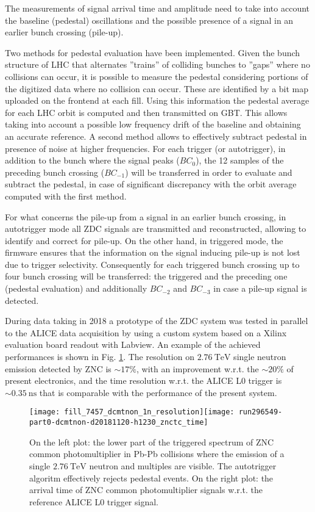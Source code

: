 The measurements of signal arrival time and amplitude need to take into account the baseline (pedestal) oscillations and the possible presence of a signal in an earlier bunch crossing (pile-up).

Two methods for pedestal evaluation have been implemented. Given the bunch structure of LHC that alternates ''trains'' of colliding bunches to ''gaps'' where no collisions can occur, it is possible to measure the pedestal considering portions of the digitized data where no collision can occur. These are identified by a bit map uploaded on the frontend at each fill. Using this information the pedestal average for each LHC orbit is computed and then transmitted on GBT. This allows taking into account a possible low frequency drift of the baseline and obtaining an accurate reference. A second method allows to effectively subtract pedestal in presence of noise at higher frequencies. For each trigger (or autotrigger), in addition to the bunch where the signal peaks ($BC_0$), the 12 samples of the preceding bunch crossing ($BC_{-1}$) will be transferred in order to evaluate and subtract the pedestal, in case of significant discrepancy with the orbit average computed with the first method.

For what concerns the pile-up from a signal in an earlier bunch crossing, in autotrigger mode all ZDC signals are transmitted and reconstructed, allowing to identify and correct for pile-up. On the other hand, in triggered mode, the firmware ensures that the information on the signal inducing pile-up is not lost due to trigger selectivity. Consequently for each triggered bunch crossing up to four bunch crossing will be transferred: the triggered and the preceding one (pedestal evaluation) and additionally $BC_{-2}$ and $BC_{-3}$ in case a pile-up signal is detected.

During \PbPb data taking in 2018 a prototype of the ZDC system was tested in parallel to the ALICE data acquisition by using a custom system based on a Xilinx evaluation board readout with Labview. An example of the achieved performances is shown in Fig. \ref{fig:zdc-signals}. The resolution on $\SI{2.76}{\tera\electronvolt}$ single neutron emission detected by ZNC is $\sim17\%$, with an improvement w.r.t. the $\sim20\%$ of present electronics, and the time resolution w.r.t. the ALICE L0 trigger is $\sim\SI{0.35}{\nano\second}$ that is comparable with the performance of the present system.

\begin{figure}
    \texttt{[image: fill\_7457\_dcmtnon\_1n\_resolution]}\texttt{[image: run296549-part0-dcmtnon-d20181120-h1230\_znctc\_time]}

    \caption{\label{fig:zdc-signals}On the left plot: the lower part of the triggered spectrum of ZNC common photomultiplier in Pb-Pb collisions where the emission of a single $\SI{2.76}{\tera\electronvolt}$ neutron  and multiples are visible. The autotrigger algoritm effectively rejects pedestal events. On the right plot: the arrival time of ZNC common photomultiplier
    signals w.r.t. the reference ALICE L0 trigger signal.}
\end{figure}
